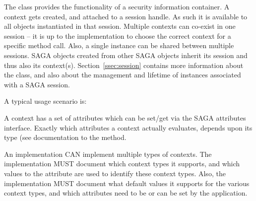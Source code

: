 
  The  class provides the
  functionality of a security information container. A context
  gets created, and attached to a session handle.  As such it is
  available to all objects instantiated in that session.
  Multiple contexts can co-exist in one session -- it is up to
  the implementation to choose the correct context for a
  specific method call.  Also, a single 
  instance can be shared between multiple
  sessions.  SAGA objects created from other SAGA objects
  inherit its session and thus also its context(s).
  Section~\ref{ssec:session} contains more information about the
   class, and also about the management and
  lifetime of  instances associated with a SAGA
  session.
 
  A typical usage scenario is:
 
 
  A context has a set of attributes which can be
  set/get via the SAGA attributes interface.  Exactly which
  attributes a context actually evaluates, depends upon its type
  (see documentation to the  method.
 
 \newpage
  
  An implementation CAN implement multiple types of
  contexts.  The implementation MUST document which context types
  it supports, and which values to the  attribute are used
  to identify these context types.  Also, the implementation
  MUST document what default values it supports for the various
  context types, and which attributes need to be or can be set by
  the application.
 
